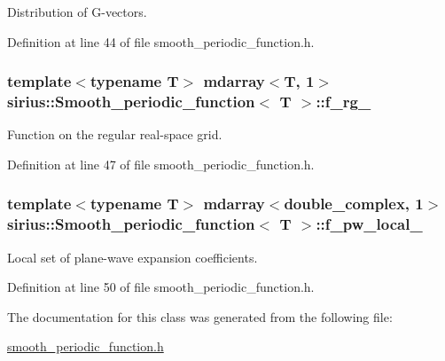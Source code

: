 Distribution of G-\/vectors. 



Definition at line 44 of file smooth\+\_\+periodic\+\_\+function.\+h.

\hypertarget{classsirius_1_1_smooth__periodic__function_a282f1e59f9ae5bf4e4e88c507b036eb0}{}
\subsubsection[{f\+\_\+rg\+\_\+}]{\setlength{\rightskip}{0pt plus 5cm}template$<$typename T$>$ mdarray$<$T, 1$>$ {\bf sirius\+::\+Smooth\+\_\+periodic\+\_\+function}$<$ T $>$\+::f\+\_\+rg\+\_\+\hspace{0.3cm}{\ttfamily [protected]}}\label{classsirius_1_1_smooth__periodic__function_a282f1e59f9ae5bf4e4e88c507b036eb0}


Function on the regular real-\/space grid. 



Definition at line 47 of file smooth\+\_\+periodic\+\_\+function.\+h.

\hypertarget{classsirius_1_1_smooth__periodic__function_acf70e39f87e7a5e51a32a98e2e328c9b}{}
\subsubsection[{f\+\_\+pw\+\_\+local\+\_\+}]{\setlength{\rightskip}{0pt plus 5cm}template$<$typename T$>$ mdarray$<$double\+\_\+complex, 1$>$ {\bf sirius\+::\+Smooth\+\_\+periodic\+\_\+function}$<$ T $>$\+::f\+\_\+pw\+\_\+local\+\_\+\hspace{0.3cm}{\ttfamily [protected]}}\label{classsirius_1_1_smooth__periodic__function_acf70e39f87e7a5e51a32a98e2e328c9b}


Local set of plane-\/wave expansion coefficients. 



Definition at line 50 of file smooth\+\_\+periodic\+\_\+function.\+h.



The documentation for this class was generated from the following file\+:\begin{DoxyCompactItemize}
\item 
\hyperlink{smooth__periodic__function_8h}{smooth\+\_\+periodic\+\_\+function.\+h}\end{DoxyCompactItemize}
